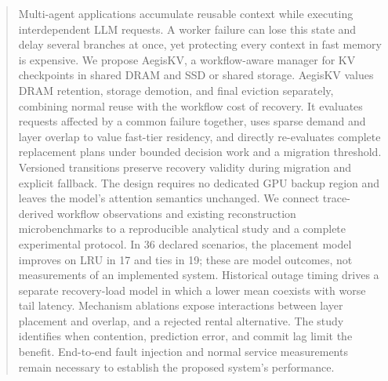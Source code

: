 \begin{abstract}
Multi-agent applications accumulate reusable context while executing
interdependent LLM requests. A worker failure can lose this state and delay
several branches at once, yet protecting every context in fast memory is
expensive. We propose AegisKV, a workflow-aware manager for KV checkpoints
in shared DRAM and SSD or shared storage. AegisKV values DRAM retention,
storage demotion, and final eviction separately, combining normal reuse
with the workflow cost of recovery. It evaluates requests affected by a
common failure together, uses sparse demand and layer overlap to value
fast-tier residency, and directly re-evaluates complete replacement plans
under bounded decision work and a migration threshold.
Versioned transitions preserve recovery validity during migration and
explicit fallback. The design requires no dedicated GPU backup region and leaves
the model's attention semantics unchanged. We connect trace-derived
workflow observations and existing reconstruction microbenchmarks to a
reproducible analytical study and a complete experimental protocol.
In 36 declared scenarios, the placement model improves on LRU in 17 and
ties in 19; these are model outcomes, not measurements of an implemented
system. Historical outage timing drives a separate recovery-load model in which
a lower mean coexists with worse tail latency. Mechanism ablations expose
interactions between layer placement and overlap, and a rejected rental
alternative. The study identifies when contention, prediction error, and commit
lag limit the benefit. End-to-end fault injection and normal
service measurements remain necessary to establish the proposed system's
performance.
\end{abstract}
